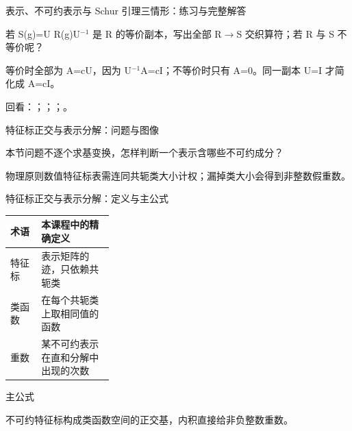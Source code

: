 \begin{frame}[t]{表示、不可约表示与 Schur 引理三情形：练习与完整解答}
\footnotesize
\begin{block}{}若 S(g)=U R(g)U\ensuremath{^{-1}} 是 R 的等价副本，写出全部 R\ensuremath{\rightarrow}S 交织算符；若 R 与 S 不等价呢？\end{block}
\begin{exampleblock}{}等价时全部为 A=cU，因为 U\ensuremath{^{-1}}A=cI；不等价时只有 A=0。同一副本 U=I 才简化成 A=cI。\end{exampleblock}
\vfill
\scriptsize 回看：；；；。
\end{frame}

\begin{frame}[t]{特征标正交与表示分解：问题与图像}
\footnotesize
\begin{block}{本节问题}不逐个求基变换，怎样判断一个表示含哪些不可约成分？\end{block}
\begin{block}{物理原则}\quad 数值特征标表需连同共轭类大小计权；漏掉类大小会得到非整数假重数。\end{block}
\end{frame}

\begin{frame}[t]{特征标正交与表示分解：定义与主公式}
\footnotesize\begin{tabularx}{\linewidth}{p{0.30\linewidth}Y}
\toprule 术语 & 本课程中的精确定义\\\midrule
{} 特征标 & 表示矩阵的迹，只依赖共轭类\\
 类函数 & 在每个共轭类上取相同值的函数\\
 重数 & 某不可约表示在直和分解中出现的次数\\
\bottomrule\end{tabularx}\vspace{0.15cm}
\begin{block}{ 主公式}\centering{}\end{block}
不可约特征标构成类函数空间的正交基，内积直接给非负整数重数。
\end{frame}

